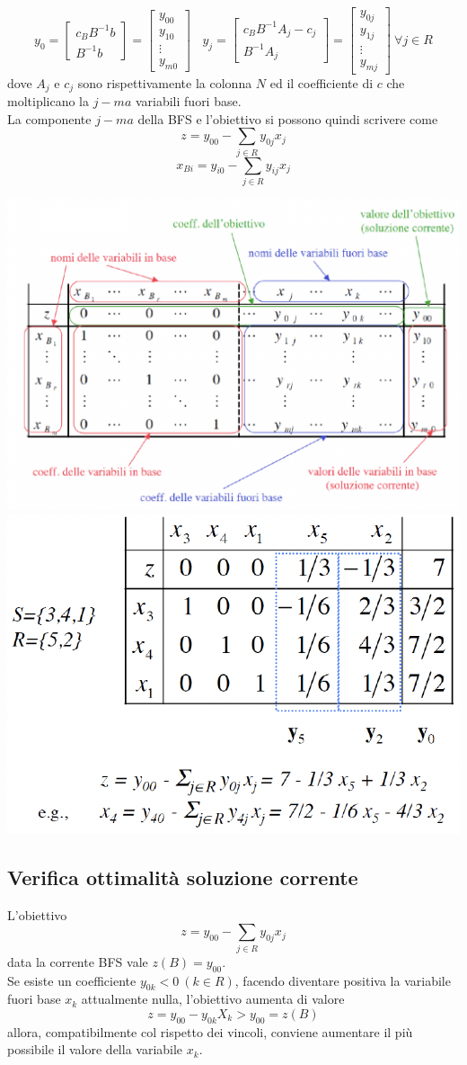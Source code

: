 \documentclass[12pt,a4paper]{article}
\begin{document}
$$y_0=\left[\begin{array}{c}c_BB^{-1}b\\B^{-1}b\end{array}\right]=\left[\begin{array}{c}y_{00}\\y_{10}\\\vdots\\y_{m0}\end{array}\right] \ \ \ \ y_j = \left[\begin{array}{c}c_BB^{-1}A_j-c_j\\B^{-1}A_j\end{array}\right] = \left[\begin{array}{c}y_{0j}\\y_{1j}\\\vdots\\y_{mj}\end{array}\right] \ \forall j \in R$$
dove $A_j$ e $c_j$ sono rispettivamente la colonna $N$ ed il coefficiente di $c$ che moltiplicano la $j-ma$ variabili fuori base.\\
La componente $j-ma$ della BFS e l'obiettivo si possono quindi scrivere come
$$z=y_{00}-\sum_{j\in R}y_{0j}x_j$$
$$x_{Bi} = y_{i0} - \sum_{j\in R}y_{ij}x_j$$
\begin{center}
\includegraphics[width=0.5\columnwidth]{img/tableau.png}
\includegraphics[width=0.5\columnwidth]{img/soles_tableau2.png}
\end{center} 
 
 \subsection{Verifica ottimalità soluzione corrente}
L'obiettivo $$z=y_{00}-\sum_{j\in R}y_{0j}x_j$$ data la corrente BFS vale $z(B)=y_{00}$.\\
Se esiste un coefficiente $y_{0k}<0\ (k\in R)$, facendo diventare positiva la variabile fuori base $x_k$ attualmente nulla, l'obiettivo aumenta di valore $$z=y_{00} - y_{0k}X_k > y_{00} = z(B)$$ allora, compatibilmente col rispetto dei vincoli, conviene aumentare il più possibile il valore della variabile $x_k$.
 
\end{document}

